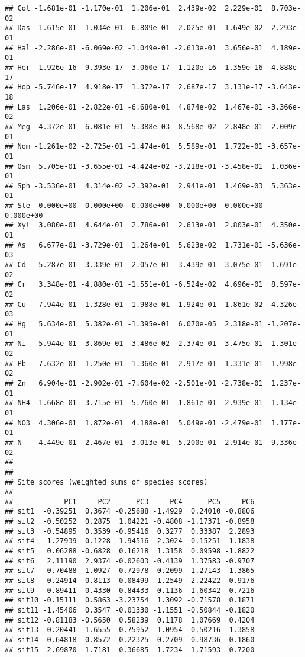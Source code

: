 \documentclass[
]{article}
\begin{document}
\begin{verbatim}
## Col -1.681e-01 -1.170e-01  1.206e-01  2.439e-02  2.229e-01  8.703e-02
## Das -1.615e-01  1.034e-01 -6.809e-01  2.025e-01 -1.649e-02  2.293e-01
## Hal -2.286e-01 -6.069e-02 -1.049e-01 -2.613e-01  3.656e-01  4.189e-01
## Her  1.926e-16 -9.393e-17 -3.060e-17 -1.120e-16 -1.359e-16  4.888e-17
## Hop -5.746e-17  4.918e-17  1.372e-17  2.687e-17  3.131e-17 -3.643e-18
## Las  1.206e-01 -2.822e-01 -6.680e-01  4.874e-02  1.467e-01 -3.366e-02
## Meg  4.372e-01  6.081e-01 -5.388e-03 -8.568e-02  2.848e-01 -2.009e-01
## Nom -1.261e-02 -2.725e-01 -1.474e-01  5.589e-01  1.722e-01 -3.657e-01
## Osm  5.705e-01 -3.655e-01 -4.424e-02 -3.218e-01 -3.458e-01  1.036e-01
## Sph -3.536e-01  4.314e-02 -2.392e-01  2.941e-01  1.469e-03  5.363e-01
## Ste  0.000e+00  0.000e+00  0.000e+00  0.000e+00  0.000e+00  0.000e+00
## Xyl  3.080e-01  4.644e-01  2.786e-01  2.613e-01  2.803e-01  4.350e-01
## As   6.677e-01 -3.729e-01  1.264e-01  5.623e-02  1.731e-01 -5.636e-03
## Cd   5.287e-01 -3.339e-01  2.057e-01  3.439e-01  3.075e-01  1.691e-02
## Cr   3.348e-01 -4.880e-01 -1.551e-01 -6.524e-02  4.696e-01  8.597e-02
## Cu   7.944e-01  1.328e-01 -1.988e-01 -1.924e-01 -1.861e-02  4.326e-03
## Hg   5.634e-01  5.382e-01 -1.395e-01  6.070e-05  2.318e-01 -1.207e-01
## Ni   5.944e-01 -3.869e-01 -3.486e-02  2.374e-01  3.475e-01 -1.301e-02
## Pb   7.632e-01  1.250e-01 -1.360e-01 -2.917e-01 -1.331e-01 -1.998e-02
## Zn   6.904e-01 -2.902e-01 -7.604e-02 -2.501e-01 -2.738e-01  1.237e-01
## NH4  1.668e-01  3.715e-01 -5.760e-01  1.861e-01 -2.939e-01 -1.134e-01
## NO3  4.306e-01  1.872e-01  4.188e-01  5.049e-01 -2.479e-01  1.177e-01
## N    4.449e-01  2.467e-01  3.013e-01  5.200e-01 -2.914e-01  9.336e-02
## 
## 
## Site scores (weighted sums of species scores)
## 
##            PC1     PC2      PC3     PC4      PC5     PC6
## sit1  -0.39251  0.3674 -0.25688 -1.4929  0.24010 -0.8806
## sit2  -0.50252  0.2875  1.04221 -0.4808 -1.17371 -0.8958
## sit3  -0.54895  0.3539 -0.95416  0.3277  0.33387  2.2893
## sit4   1.27939 -0.1228  1.94516  2.3024  0.15251  1.1838
## sit5   0.06288 -0.6828  0.16218  1.3158  0.09598 -1.8822
## sit6   2.11190  2.9374 -0.02603 -0.4139  1.37583 -0.9707
## sit7  -0.70488  1.0927  0.72978  0.2099 -1.27143  1.3865
## sit8  -0.24914 -0.8113  0.08499 -1.2549  2.22422  0.9176
## sit9  -0.89411  0.4330  0.84433  0.1136 -1.60342 -0.7216
## sit10 -0.15111  0.5863 -3.23754  1.3092 -0.71578  0.1871
## sit11 -1.45406  0.3547 -0.01330 -1.1551 -0.50844 -0.1820
## sit12 -0.81183 -0.5650  0.58239  0.1178  1.07669  0.4204
## sit13  0.20441 -1.6555 -0.75952  1.0954  0.50216 -1.3858
## sit14 -0.64818 -0.8572  0.22325 -0.2709  0.98736 -0.1860
## sit15  2.69870 -1.7181 -0.36685 -1.7234 -1.71593  0.7200
\end{verbatim}
\end{document}
